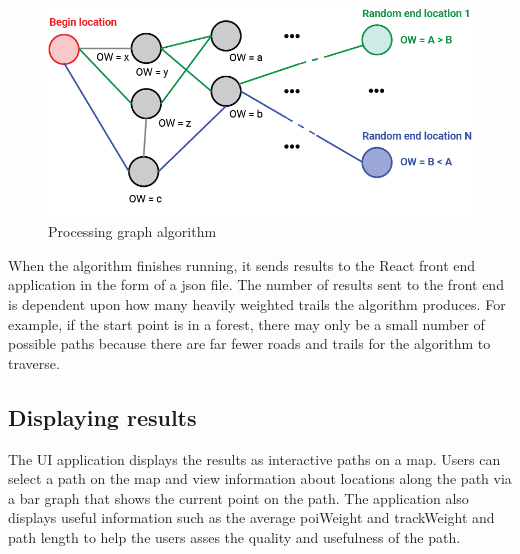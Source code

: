 \documentclass[sigconf]{acmart}
\begin{document}
\begin{figure}[htbp]
  \centering
  \includegraphics[width=\columnwidth]{pro.png}
  \caption{Processing graph algorithm}
\end{figure}

When the algorithm finishes running, it sends results to the React front end application in the form of a json file. The number of results sent to the front end is dependent upon how many heavily weighted trails the algorithm produces. For example, if the start point is in a forest, there may only be a small number of possible paths because there are far fewer roads and trails for the algorithm to traverse.




\subsection{Displaying results}
The UI application displays the results as interactive paths on a map. Users can select a path on the map and view information about locations along the path via a bar graph that shows the current point on the path. The application also displays useful information such as the average poiWeight and trackWeight and path length to help the users asses the quality and usefulness of the path.

\end{document}
